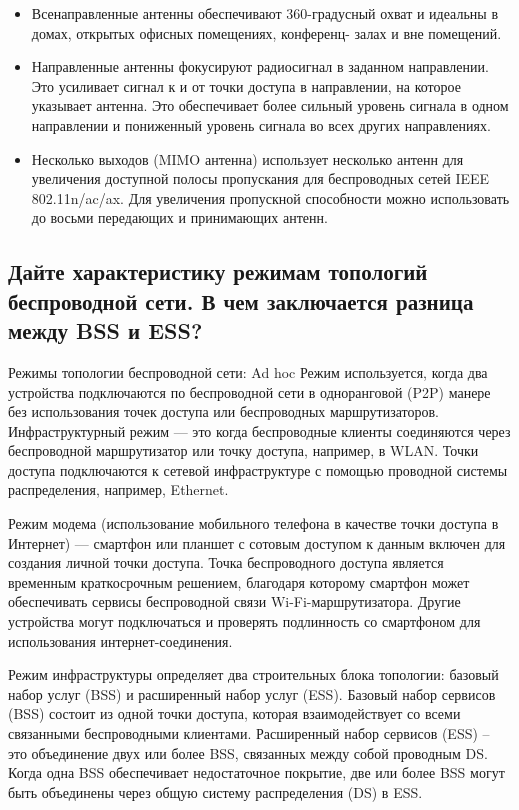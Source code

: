 \begin{itemize}
	\item Всенаправленные антенны обеспечивают 360-градусный охват 
		и идеальны в домах, открытых офисных помещениях, конференц-
		залах и вне помещений.
	\item Направленные антенны фокусируют радиосигнал в заданном 
		направлении. Это усиливает сигнал к и от точки доступа в 
		направлении, на которое указывает антенна. Это обеспечивает более 
		сильный уровень сигнала в одном направлении и пониженный 
		уровень сигнала во всех других направлениях.
	\item Несколько выходов (MIMO антенна) использует несколько 
		антенн для увеличения доступной полосы пропускания для 
		беспроводных сетей IEEE 802.11n/ac/ax. Для увеличения пропускной 
		способности можно использовать до восьми передающих и 
		принимающих антенн.
\end{itemize}

\subsection{Дайте характеристику режимам топологий беспроводной сети. В 
чем заключается разница между BSS и ESS?}

Режимы топологии беспроводной сети:
Ad hoc Режим используется, когда два устройства подключаются 
по беспроводной сети в одноранговой (P2P) манере без 
использования точек доступа или беспроводных маршрутизаторов.
Инфраструктурный режим --- это когда беспроводные клиенты 
соединяются через беспроводной маршрутизатор или точку доступа, 
например, в WLAN. Точки доступа подключаются к сетевой 
инфраструктуре с помощью проводной системы распределения, 
например, Ethernet.\par
Режим модема (использование мобильного телефона в качестве 
точки доступа в Интернет) --- смартфон или планшет с сотовым 
доступом к данным включен для создания личной точки доступа. 
Точка беспроводного доступа является временным краткосрочным 
решением, благодаря которому смартфон может обеспечивать 
сервисы беспроводной связи Wi-Fi-маршрутизатора. Другие 
устройства могут подключаться и проверять подлинность со 
смартфоном для использования интернет-соединения.\par
Режим инфраструктуры определяет два строительных блока топологии: 
базовый набор услуг (BSS) и расширенный набор услуг (ESS).
Базовый набор сервисов (BSS) состоит из одной точки доступа, 
которая взаимодействует со всеми связанными беспроводными клиентами.
Расширенный набор сервисов (ESS) – это объединение двух или 
более BSS, связанных между собой проводным DS. Когда одна BSS 
обеспечивает недостаточное покрытие, две или более BSS могут быть 
объединены через общую систему распределения (DS) в ESS.

